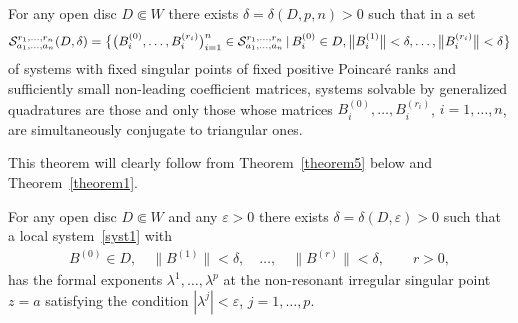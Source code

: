 \begin{Theorem}\label{theorem4}
For any open disc $D\Subset W$ there exists $\delta=\delta(D,p,n)>0$ such that in a set
\begin{gather*}
{\cal S}_{a_1,\ldots,a_n}^{r_1,\ldots,r_n}(D,\delta)=\bigl\{ \big(B^{(0)}_i,\ldots,B^{(r_i)}_i\big)_{i=1}^n \in
{\cal S}_{a_1,\ldots,a_n}^{r_1,\ldots,r_n} \,|\, B^{(0)}_i \in D, \big\|B^{(1)}_i\big\|<\delta,\ldots,\big\|B^{(r_i)}_i\big\|<\delta\bigr\}
\end{gather*}
of systems with fixed singular points of fixed positive Poincar\'e ranks and sufficiently small non-leading coefficient matrices, systems solvable by generalized quadratures are those and only those whose matrices $B^{(0)}_i,\ldots,B^{(r_i)}_i$, $i=1,\ldots,n$, are simultaneously conjugate to triangular ones.
\end{Theorem}

This theorem will clearly follow from Theorem~\ref{theorem5} below and Theorem~\ref{theorem1}.

\begin{Theorem}\label{theorem5}
For any open disc $D\Subset W$ and any $\varepsilon>0$ there exists $\delta=\delta(D,\varepsilon)>0$ such that a local system~\eqref{syst1} with
\begin{gather*}
B^{(0)}\in D, \quad \big\|B^{(1)}\big\|<\delta, \quad \ldots, \quad \big\|B^{(r)}\big\|<\delta, \qquad r>0,
\end{gather*}
has the formal exponents $\lambda^1,\ldots,\lambda^p$ at the non-resonant irregular singular point $z=a$ satisfying the condition $|\lambda^j|<\varepsilon$, $j=1,\ldots,p$.
\end{Theorem}


